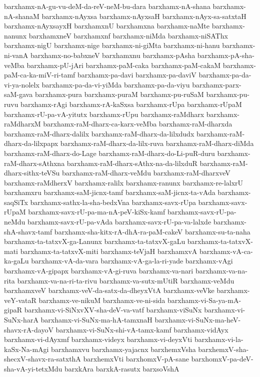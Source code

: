{barxhamx-nA-gu-vu-deM-da-reV-neM-bu-dara
barxhamx-nA-shana
barxhamx-nA-shanaM
barxhamx-nAyxsa
barxhamx-nAyxsaH
barxhamx-nAyx-sa-satxtaH
barxhamx-nAyxsayxH
barxhamxnU
barxhamxna
barxhamx-naMte
barxhamx-nanunx
barxhamxneV
barxhamxnf
barxhamx-niMda
barxhamx-niSAThx
barxhamx-nigU
barxhamx-nige
barxhamx-ni-giMta
barxhamx-ni-hanu
barxhamx-ni-vanA
barxhamx-no-babxneV
barxhamxnu
barxhamx-pAsha
barxhamx-pA-sha-veMba
barxhamx-pU-jAri
barxhamx-paM-caka
barxhamx-paM-cakaM
barxhamx-paM-ca-ka-miV-ri-tamf
barxhamx-pa-davi
barxhamx-pa-daviV
barxhamx-pa-da-vi-ya-nolelx
barxhamx-pa-da-vi-yiMda
barxhamx-pa-da-viyu
barxhamx-parx-saM-gava
barxhamx-pura
barxhamx-puraM
barxhamx-pu-ruSaM
barxhamx-pu-ruvu
barxhamx-rAgi
barxhamx-rA-kaSxsa
barxhamx-rUpa
barxhamx-rUpaM
barxhamx-rU-pa-vA-yitutx
barxhamx-rUpu
barxhamx-raMdharx
barxhamx-raMdharxM
barxhamx-raM-dharx-ca-karx-veMba
barxhamx-raM-dharxda
barxhamx-raM-dharx-dalilx
barxhamx-raM-dharx-da-lilxdudx
barxhamx-raM-dharx-da-lilxpapx
barxhamx-raM-dharx-da-lilx-ruva
barxhamx-raM-dharx-diMda
barxhamx-raM-dharx-do-Lage
barxhamx-raM-dharx-do-Li-puR-duru
barxhamx-raM-dharx-sAthxna
barxhamx-raM-dharx-sAthx-na-da-lilxduR
barxhamx-raM-dharx-sithx-teVSu
barxhamx-raM-dharx-veMdu
barxhamx-raM-dharxveV
barxhamx-raMdherxV
barxhamx-ralilx
barxhamx-ranunx
barxhamx-re-lalxrU
barxhamxru
barxhamx-saM-jicnx-tamf
barxhamx-saM-jicnx-ta-vAda
barxhamx-saqSiTx
barxhamx-sathx-la-sha-bedxVna
barxhamx-savx-rUpa
barxhamx-savx-rUpaM
barxhamx-savx-rU-pa-ma-nA-peV-kiSx-kamf
barxhamx-savx-rU-pa-neMdu
barxhamx-savx-rU-pa-vAda
barxhamx-savx-rU-pa-va-lalxde
barxhamx-shA-shavx-tamf
barxhamx-sha-kitx-rA-dhA-ra-paM-cakeV
barxhamx-su-ta-naha
barxhamx-ta-tatxvX-ga-Lanunx
barxhamx-ta-tatxvX-gaLu
barxhamx-ta-tatxvX-mati
barxhamx-ta-tatxvX-miti
barxhamx-teVjaH
barxhamxvA
barxhamx-vA-ca-ka-gaLu
barxhamx-vA-da-vara
barxhamx-vA-ga-la-ri-yade
barxhamx-vAgi
barxhamx-vA-gipapx
barxhamx-vA-gi-ruva
barxhamx-va-nari
barxhamx-va-na-rita
barxhamx-va-na-ri-ta-rivu
barxhamx-va-sutx-mUtiR
barxhamx-veMdu
barxhamxveV
barxhamx-veV-da-satx-da-dheyxVtA
barxhamx-veVke
barxhamx-veY-vataR
barxhamx-ve-nikuM
barxhamx-ve-ni-sida
barxhamx-vi-Sa-ya-mA-gipaR
barxhamx-vi-SiNxvXV-sha-deV-va-vatf
barxhamx-viSuNx
barxhamx-vi-SuNx-harA
barxhamx-vi-SuNx-ma-hA-tamxnaH
barxhamx-vi-SuNx-ma-heV-shavx-rA-dayoV
barxhamx-vi-SuNx-shi-vA-tamx-kamf
barxhamx-vidAyx
barxhamx-vi-dAyxmf
barxhamx-videyx
barxhamx-vi-deyxVti
barxhamx-vi-la-kaSx-Na-mAgi
barxhamxvu
barxhamx-yajacnx
barxhemxVsha
barxhemxV-sha-shecxV-shavx-ra-satxthA
barxhemxVti
barxhomxV-pA-sane
barxhomxV-pa-deV-sha-vA-yi-tetxMdu
barxkAra
barxkA-rasutx
barxsoVshA
}

